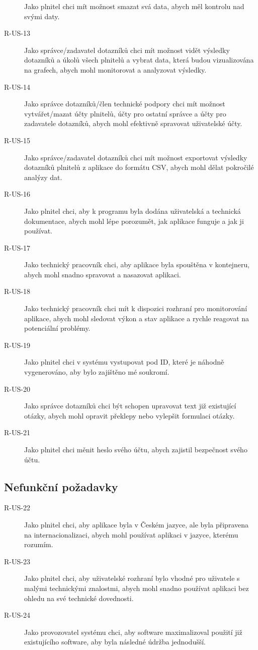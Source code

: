 \begin{description}
    Jako plnitel chci mít možnost smazat svá data, abych měl kontrolu nad svými daty.
    \item[R-US-13]
    Jako správce/zadavatel dotazníků chci mít možnost vidět výsledky dotazníků a úkolů všech plnitelů a vybrat data, která budou vizualizována na grafech, abych mohl monitorovat a analyzovat výsledky.
    \item[R-US-14]
    Jako správce dotazníků/člen technické podpory chci mít možnost vytvářet/mazat účty plnitelů, účty pro ostatní správce a účty pro zadavatele dotazníků, abych mohl efektivně spravovat uživatelské účty.
    \item[R-US-15]
    Jako správce/zadavatel dotazníků chci mít možnost exportovat výsledky dotazníků plnitelů z aplikace do formátu CSV, abych mohl dělat pokročilé analýzy dat.
    \item[R-US-16]
    Jako plnitel chci, aby k programu byla dodána uživatelská a technická dokumentace, abych mohl lépe porozumět, jak aplikace funguje a jak ji používat.
    \item[R-US-17]
    Jako technický pracovník chci, aby aplikace byla spouštěna v kontejneru, abych mohl snadno spravovat a nasazovat aplikaci.
    \item[R-US-18]
    Jako technický pracovník chci mít k dispozici rozhraní pro monitorování aplikace, abych mohl sledovat výkon a stav aplikace a rychle reagovat na potenciální problémy.
    \item[R-US-19]
    Jako plnitel chci v systému vystupovat pod ID, které je náhodně vygenerováno, aby bylo zajištěno mé soukromí.
    \item[R-US-20]
    Jako správce dotazníků chci být schopen upravovat text již existující otázky, abych mohl opravit překlepy nebo vylepšit formulaci otázky.
    \item[R-US-21]
    Jako plnitel chci měnit heslo svého účtu, abych zajistil bezpečnost svého účtu.
\end{description}

\subsection{Nefunkční požadavky}\label{subsec:user-stories-nefunkcni-pozadavky}

\begin{description}
    \item[R-US-22]
    Jako plnitel chci, aby aplikace byla v Českém jazyce, ale byla připravena na internacionalizaci, abych mohl používat aplikaci v jazyce, kterému rozumím.
    \item[R-US-23]
    Jako plnitel chci, aby uživatelské rozhraní bylo vhodné pro uživatele s malými technickými znalostmi, abych mohl snadno používat aplikaci bez ohledu na své technické dovednosti.
    \item[R-US-24]
    Jako provozovatel systému chci, aby software maximalizoval použití již existujícího software, aby byla následné údržba jednodušší.
\end{description}

